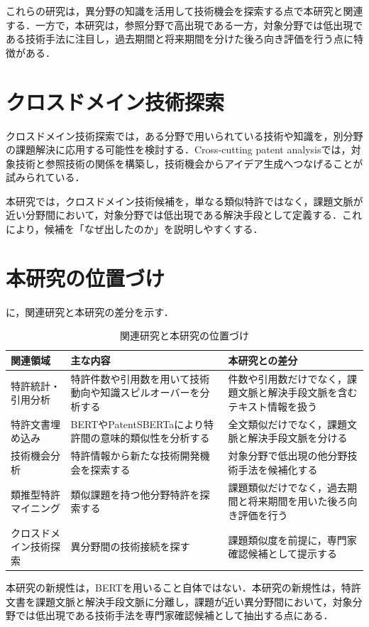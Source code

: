 これらの研究は，異分野の知識を活用して技術機会を探索する点で本研究と関連する．一方で，本研究は，参照分野で高出現である一方，対象分野では低出現である技術手法に注目し，過去期間と将来期間を分けた後ろ向き評価を行う点に特徴がある．

\section{クロスドメイン技術探索}
クロスドメイン技術探索では，ある分野で用いられている技術や知識を，別分野の課題解決に応用する可能性を検討する．Cross-cutting patent analysisでは，対象技術と参照技術の関係を構築し，技術機会からアイデア生成へつなげることが試みられている\cite{liu2021crosscutting}．

本研究では，クロスドメイン技術候補を，単なる類似特許ではなく，課題文脈が近い分野間において，対象分野では低出現である解決手段として定義する．これにより，候補を「なぜ出したのか」を説明しやすくする．

\section{本研究の位置づけ}
に，関連研究と本研究の差分を示す．

\begin{table}[htbp]
  \centering
  \caption{関連研究と本研究の位置づけ}
  \label{tab:related_position}
  \begin{tabularx}{\textwidth}{p{32mm}X X}
    \toprule
    関連領域 & 主な内容 & 本研究との差分 \\
    \midrule
    特許統計・引用分析 & 特許件数や引用数を用いて技術動向や知識スピルオーバーを分析する & 件数や引用数だけでなく，課題文脈と解決手段文脈を含むテキスト情報を扱う \\
    特許文書埋め込み & BERTやPatentSBERTaにより特許間の意味的類似性を分析する & 全文類似だけでなく，課題文脈と解決手段文脈を分ける \\
    技術機会分析 & 特許情報から新たな技術開発機会を探索する & 対象分野で低出現の他分野技術手法を候補化する \\
    類推型特許マイニング & 類似課題を持つ他分野特許を探索する & 課題類似だけでなく，過去期間と将来期間を用いた後ろ向き評価を行う \\
    クロスドメイン技術探索 & 異分野間の技術接続を探す & 課題類似度を前提に，専門家確認候補として提示する \\
    \bottomrule
  \end{tabularx}
\end{table}

本研究の新規性は，BERTを用いること自体ではない．本研究の新規性は，特許文書を課題文脈と解決手段文脈に分離し，課題が近い異分野間において，対象分野では低出現である技術手法を専門家確認候補として抽出する点にある．
